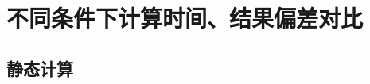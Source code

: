 \section{不同条件下计算时间、结果偏差对比}

\subsection{静态计算}

\begin{comment}

由于\ProgramName 和Citation均使用迭代算法进行求解，
而迭代算法的计算时间和通量的收敛程度有直接关系，
一般来说计算时间和迭代次数成正比。
但无论是计算本征值的外迭代还是求解线性方程的内迭代，
\ProgramName 和Citation都使用了不同的迭代方式，
两者对偏差的估计方式也有所差别，不宜直接进行比较。

\begin{figure}
\centering
\texttt{[image: testresult\_iaea\_1cm]}
\caption{\label{fig:testresult.iaea}静态IAEA三维基准题1cm网格\ProgramName 与Citation的计算时间-通量最大偏差图}
\end{figure}

在实际应用中，相同偏差时的计算时间才能反映程序间的速度差异，
这里分别选取不同的收敛精度使用\ProgramName 和Citation进行计算，
绘制两者的计算时间--偏差图，
这里取Citation在$\epsilon_\phi=5\times10^{-7}$时的计算结果作为参考值，
对于静态IAEA PWR 三维基准题1cm网格划分，
\ProgramName 与Citation在不同精度下的计算时间见\floatref{fig:testresult.iaea}，
可见不同的算法的计算时间和结果精度的关系差异很大，对结果进行拟合得
\begin{align}
  &T_\mathrm{CG-SG\ ML} = \exp\pb{-0.235151\log \epsilon_\phi-146.097\epsilon_\phi+1.87266}\\
  &T_\mathrm{CG-SG} = \exp\pb{-0.307056\log \epsilon_\phi+2.02687} \\
  &T_\mathrm{Citation} = \exp\pb{-414.444\epsilon_\phi+10.7569} 
\end{align}
取结果偏差为$\epsilon_\phi=0.01,0.003,0.001$进行比较得

\begin{table}
\centering
\begin{tabular}{crrr}
\topline
$\epsilon_\phi$ & $T_\mathrm{Citation}$ & $T_\mathrm{CG-SG\ ML}$ & $T_\mathrm{CG-SG}$\\
\midline
0.01  &   744.31 &  4.46 & 31.22 \\
0.003 & 13542.20 & 16.45 & 45.18 \\
0.001 & 31022.10 & 28.53 & 63.30 \\
\bottomline
\end{tabular}
\end{table}

\end{comment}

